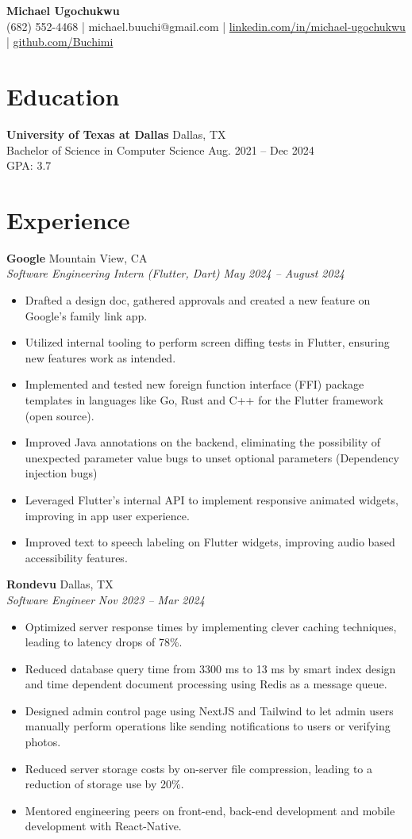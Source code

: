 \documentclass[11pt,letterpaper]{article}
\newcommand{\namesection}[3]{
  \begin{center}
    \huge\textbf{#1}\\[4pt]
    \normalsize#2 | #3
  \end{center}
}
\newcommand{\job}[4]{
  \textbf{#1} \hfill #2\\
  \textit{#3} \hfill \textit{#4}\\
}
\begin{document}
\namesection{Michael Ugochukwu}
  {(682) 552-4468 | michael.buuchi@gmail.com}
  {\href{https://linkedin.com/in/michael-ugochukwu}{linkedin.com/in/michael-ugochukwu} | \href{https://github.com/Buchimi}{github.com/Buchimi}}

\section{Education}
\textbf{University of Texas at Dallas} \hfill Dallas, TX\\
Bachelor of Science in Computer Science \hfill Aug. 2021 – Dec 2024\\
GPA: 3.7

\section{Experience}
\job{Google}{Mountain View, CA}{Software Engineering Intern (Flutter, Dart)}{May 2024 – August 2024}
\begin{itemize}[leftmargin=*,nosep]
  \item Drafted a design doc, gathered approvals and created a new feature on Google's family link app.
  \item Utilized internal tooling to perform screen diffing tests in Flutter, ensuring new features work as intended.
  \item Implemented and tested new foreign function interface (FFI) package templates in languages like Go, Rust and C++ for the Flutter framework (open source).
  \item Improved Java annotations on the backend, eliminating the possibility of unexpected parameter value bugs to unset optional parameters (Dependency injection bugs)
  \item Leveraged Flutter's internal API to implement responsive animated widgets, improving in app user experience.
  \item Improved text to speech labeling on Flutter widgets, improving audio based accessibility features.
\end{itemize}

\job{Rondevu}{Dallas, TX}{Software Engineer}{Nov 2023 – Mar 2024}
\begin{itemize}[leftmargin=*,nosep]
  \item Optimized server response times by implementing clever caching techniques, leading to latency drops of 78\%.
  \item Reduced database query time from 3300 ms to 13 ms by smart index design and time dependent document processing using Redis as a message queue.
  \item Designed admin control page using NextJS and Tailwind to let admin users manually perform operations like sending notifications to users or verifying photos.
  \item Reduced server storage costs by on-server file compression, leading to a reduction of storage use by 20\%.
  \item Mentored engineering peers on front-end, back-end development and mobile development with React-Native.
\end{itemize}
\end{document}
